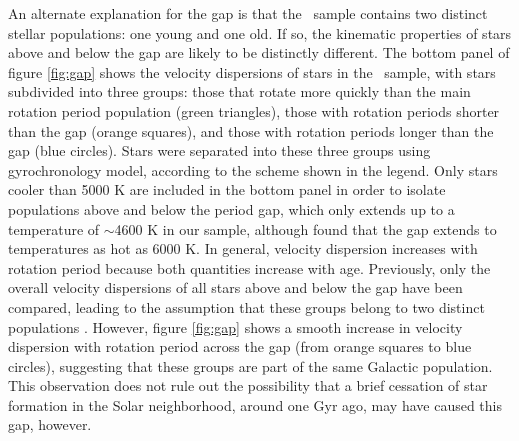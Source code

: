 \documentclass{aastex63}
\newcommand{\mct}{\citet{mcquillan2014}}
\begin{document}
An alternate explanation for the gap is that the \mct\ sample contains two
distinct stellar populations: one young and one old.
If so, the kinematic properties of stars above and below the gap are likely to
be distinctly different.
The bottom panel of figure \ref{fig:gap} shows the velocity dispersions of
stars in the \mct\ sample, with stars subdivided into three groups: those that
rotate more quickly than the main rotation period population (green
triangles), those with rotation periods shorter than the gap (orange squares),
and those with rotation periods longer than the gap (blue circles).
Stars were separated into these three groups using \citet{angus2019}
gyrochronology model, according to the scheme shown in the legend.
Only stars cooler than 5000 K are included in the bottom panel in order to
isolate populations above and below the period gap, which only extends up to a
temperature of $\sim$4600 K in our sample, although \citet{davenport2017}
found that the gap extends to temperatures as hot as 6000 K.
In general, velocity dispersion increases with rotation period because both
quantities increase with age.
Previously, only the overall velocity dispersions of all stars above and below
the gap have been compared, leading to the assumption that these groups belong
to two distinct populations \citep{mcquillan2014}.
However, figure \ref{fig:gap} shows a smooth increase in velocity dispersion
with rotation period across the gap (from orange squares to blue circles),
suggesting that these groups are part of the same Galactic population.
This observation does not rule out the possibility that a brief cessation of
star formation in the Solar neighborhood, around one Gyr ago, may have caused
this gap, however.
\end{document}
